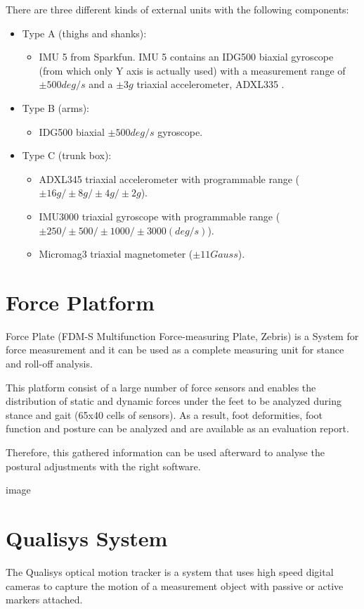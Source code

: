 There are three different kinds of external units with the following components:
\begin{itemize}
	\item Type A (thighs and shanks): 
	\begin{itemize}
		\item IMU 5 from Sparkfun. IMU 5 contains an IDG500  biaxial gyroscope (from which only Y axis is actually used) with a measurement range of $\pm500deg/s$ and a $\pm3g$ triaxial accelerometer, ADXL335 .
	\end{itemize}
	\item Type B (arms):
	\begin{itemize}
		\item IDG500  biaxial $\pm500deg/s$ gyroscope.
	\end{itemize}
	\item Type C (trunk box):
	\begin{itemize}
		\item ADXL345  triaxial accelerometer with programmable range ($\pm16g/\pm8g/\pm4g/\pm2g$).
		\item IMU3000 triaxial gyroscope with programmable range ($\pm250/\pm500/\pm1000/\pm3000 (deg/s)$).
		\item Micromag3  triaxial magnetometer ($\pm11Gauss$).
	\end{itemize}
\end{itemize}


\section{Force Platform}
Force Plate (FDM-S Multifunction Force-measuring Plate, Zebris) is a System for force measurement and it can be used as a complete measuring unit for stance and roll-off analysis. \cite{forceplate}

This platform consist of a large number of force sensors and enables the distribution of static and dynamic forces under the feet to be analyzed during stance and gait (65x40 cells of sensors). As a result, foot deformities, foot function and posture can be analyzed and are available as an evaluation report. \cite{forceplate}

Therefore, this gathered information can be used afterward to analyse the postural adjustments with the right software.



											image


\section{Qualisys System}
The Qualisys optical motion tracker is a system that uses high speed digital cameras to capture the motion of a measurement object with passive or active markers attached.  \cite{OlivaresBotzel2013}

